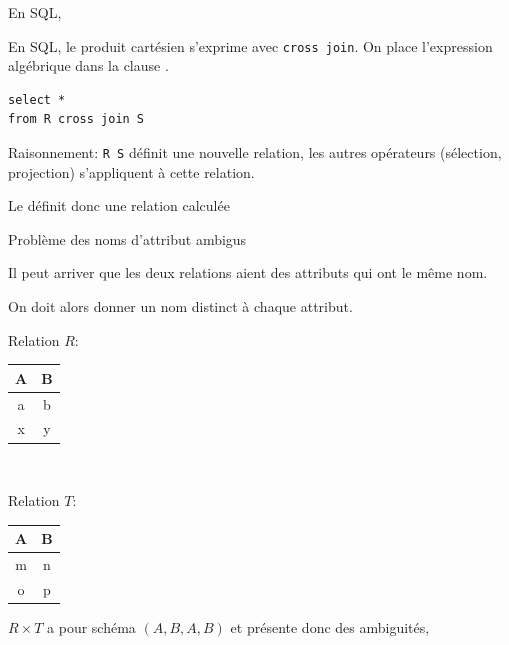 \begin{frame}[fragile]{En SQL, }

En SQL, le produit cartésien s'exprime avec \texttt{cross join}. 
On place l'expression algébrique \alert{dans} la clause .

\vfill


\begin{verbatim}
select * 
from R cross join S
\end{verbatim}

\vfill

\alert{Raisonnement}: \texttt{R  S} définit une  nouvelle relation, les 
autres opérateurs (sélection, projection) s'appliquent à cette relation.

\vfill

\begin{blocgauche}
Le  définit donc une relation \alert{calculée}
\end{blocgauche}
\end{frame}

\begin{frame}[fragile]{Problème des noms d'attribut ambigus}

Il peut arriver que les deux relations
aient des attributs qui ont le même nom. 

\vfill

On doit alors  donner un nom distinct à chaque attribut.

\vfill

\begin{minipage}[t]{6cm}
\begin{center}
Relation $R$:
\begin{tabular}{c|c}
A & B \\ \hline
a & b  \\
x & y  \\\hline 
\end{tabular}
\end{center}
\end{minipage} \
\begin{minipage}[t]{6cm}
\begin{center}
Relation $T$:
\begin{tabular}{c|c}
A & B \\ \hline
m & n  \\
o & p  \\\hline 
\end{tabular}
\end{center}
\end{minipage} 


\vfill
\begin{blocgauche}
$R \times T$
a pour schéma $(A, B, A, B)$ et présente
donc des ambiguités,
\end{blocgauche}
\end{frame}


